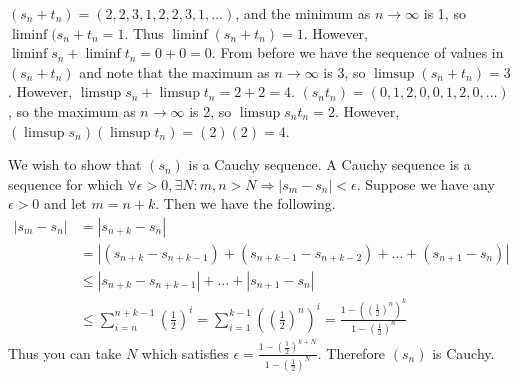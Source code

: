 \documentclass{homework}
\begin{document}
\question
\begin{alphaparts}
	\questionpart $(s_n + t_n) = (2, 2, 3, 1, 2, 2, 3, 1, \dots)$, and the minimum as $n \to \infty$ is 1, so $\liminf(s_n + t_n = 1$. Thus $\liminf (s_n + t_n) = 1$. However, $\liminf s_n + \liminf t_n = 0 + 0 = 0$.
	\questionpart From before we have the sequence of values in $(s_n + t_n)$ and note that the maximum as $n \to \infty$ is 3, so $\limsup (s_n + t_n) = 3$. However, $\limsup s_n + \limsup t_n = 2 + 2 = 4$.
	\questionpart $(s_n t_n) = (0, 1, 2, 0, 0, 1, 2, 0, \dots)$, so the maximum as $n \to \infty$ is 2, so $\limsup s_n t_n = 2$. However, $(\limsup s_n)(\limsup t_n) = (2)(2) = 4$.
\end{alphaparts}

\question
We wish to show that $(s_n)$ is a Cauchy sequence. A Cauchy sequence is a sequence for which $\forall \epsilon > 0, \exists N: m, n > N \Rightarrow |s_m - s_n| < \epsilon$. Suppose we have any $\epsilon > 0$ and let $m = n + k$. Then we have the following.
\begin{align*}
	|s_m - s_n|	&=	|s_{n+k} - s_n|	\\
				&=	|(s_{n+k} - s_{n+k-1}) + (s_{n+k-1} - s_{n+k-2}) + \dots + (s_{n+1} - s_n)|	\\
				&\le	|s_{n+k} - s_{n+k-1}| + \dots + |s_{n+1} - s_n|	\\
				&\le	\sum_{i=n}^{n+k-1} (\frac{1}{2})^i
				=	\sum_{i=1}^{k-1} ((\frac{1}{2})^n)^i
				=	\frac{1 - ((\frac{1}{2})^n)^k}{1-(\frac{1}{2})^n}
\end{align*}
Thus you can take $N$ which satisfies $\epsilon = \frac{1 - (\frac{1}{2})^{k+N}}{1-(\frac{1}{2})^N}$. Therefore $(s_n)$ is Cauchy.
\end{document}
